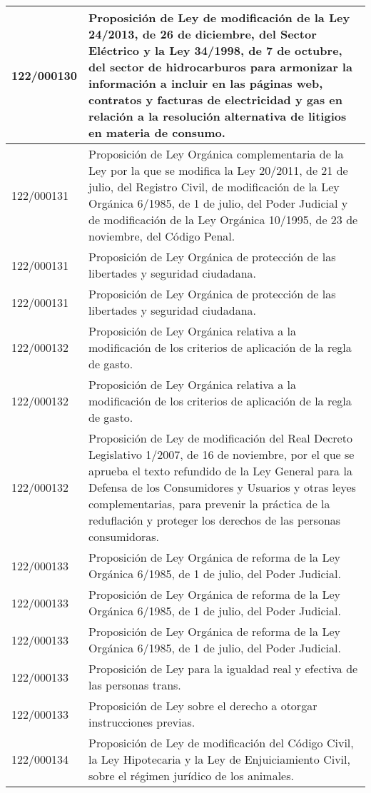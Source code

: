 {\begin{table}[H]
\begin{center}
\begin{tabularx}{\linewidth}{| l | X |}
\hline
122/000130 & Proposición de Ley de modificación de la Ley 24/2013, de 26 de diciembre, del Sector Eléctrico y la Ley 34/1998, de 7 de octubre, del sector de hidrocarburos para armonizar la información a incluir en las páginas web, contratos y facturas de electricidad y gas en relación a la resolución alternativa de litigios en materia de consumo. \\
\hline
122/000131 & Proposición de Ley Orgánica complementaria de la Ley por la que se modifica la Ley 20/2011, de 21 de julio, del Registro Civil, de modificación de la Ley Orgánica 6/1985, de 1 de julio, del Poder Judicial y de modificación de la Ley Orgánica 10/1995, de 23 de noviembre, del Código Penal. \\
\hline
122/000131 & Proposición de Ley Orgánica de protección de las libertades y seguridad ciudadana. \\
\hline
122/000131 & Proposición de Ley Orgánica de protección de las libertades y seguridad ciudadana. \\
\hline
122/000132 & Proposición de Ley Orgánica relativa a la modificación de los criterios de aplicación de la regla de gasto. \\
\hline
122/000132 & Proposición de Ley Orgánica relativa a la modificación de los criterios de aplicación de la regla de gasto. \\
\hline
122/000132 & Proposición de Ley de modificación del Real Decreto Legislativo 1/2007, de 16 de noviembre, por el que se aprueba el texto refundido de la Ley General para la Defensa de los Consumidores y Usuarios y otras leyes complementarias, para prevenir la práctica de la reduflación y proteger los derechos de las personas consumidoras. \\
\hline
122/000133 & Proposición de Ley Orgánica de reforma de la Ley Orgánica 6/1985, de 1 de julio, del Poder Judicial. \\
\hline
122/000133 & Proposición de Ley Orgánica de reforma de la Ley Orgánica 6/1985, de 1 de julio, del Poder Judicial. \\
\hline
122/000133 & Proposición de Ley Orgánica de reforma de la Ley Orgánica 6/1985, de 1 de julio, del Poder Judicial. \\
\hline
122/000133 & Proposición de Ley para la igualdad real y efectiva de las personas trans. \\
\hline
122/000133 & Proposición de Ley sobre el derecho a otorgar instrucciones previas. \\
\hline
122/000134 & Proposición de Ley de modificación del Código Civil, la Ley Hipotecaria y la Ley de Enjuiciamiento Civil, sobre el régimen jurídico de los animales. \\

\end{tabularx}
\end{center}
\end{table}}
